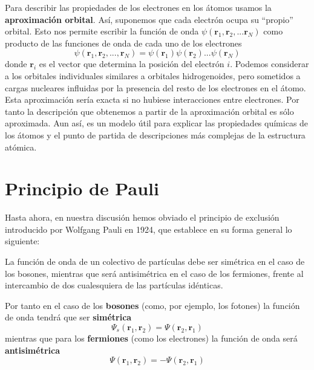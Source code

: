 Para describir las propiedades de los electrones en los átomos
usamos la \textbf{aproximación orbital}. Así, suponemos que cada
electrón ocupa su “propio” orbital. Esto nos permite escribir la
función de onda 
$\psi(\mathbf{r}_1,\mathbf{r}_2,...\mathbf{r}_N)$
como producto de las funciones de onda de cada uno de
los electrones
\begin{equation}
    \psi(\mathbf{r}_1, \mathbf{r}_2, ..., \mathbf{r}_N) = \psi(\mathbf{r}_1)\psi(\mathbf{r}_2)...\psi(\mathbf{r}_ N)
\end{equation}
donde $\mathbf{r}_i$ es el vector que determina la posición 
del electrón $i$. Podemos considerar a los orbitales individuales
similares a orbitales hidrogenoides, pero sometidos a cargas
nucleares influidas por la presencia del resto de los electrones
en el átomo. Esta aproximación sería exacta si no hubiese
interacciones entre electrones. Por tanto la descripción 
que obtenemos a partir de la aproximación orbital es sólo
aproximada. Aun así, es un modelo útil para explicar
las propiedades químicas de los átomos y el punto de partida de 
descripciones más complejas de la estructura atómica. 

\section{Principio de Pauli}
Hasta ahora, en nuestra discusión hemos obviado el principio de 
exclusión introducido por Wolfgang Pauli en 1924, que
establece en su forma general lo siguiente: 
\begin{displayquote}
La función de onda de un colectivo de partículas 
debe ser simétrica en el caso de los bosones, mientras que
será antisimétrica en el caso de los fermiones,
frente al intercambio de dos cualesquiera de las partículas
idénticas.
\end{displayquote}
Por tanto en el caso de los \textbf{bosones} (como, por ejemplo,
los fotones) la función de onda tendrá que ser
\textbf{simétrica}
\begin{equation}
    \Psi_s(\mathbf{r}_1,\mathbf{r}_2)=\Psi(\mathbf{r}_2,\mathbf{r}_1)
\end{equation}
mientras que para los \textbf{fermiones} (como los electrones)
la función de onda será \textbf{antisimétrica}
\begin{equation}
    \Psi(\mathbf{r}_1,\mathbf{r}_2)=-\Psi(\mathbf{r}_2,\mathbf{r}_1)
\end{equation}

